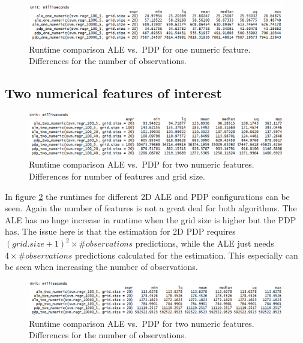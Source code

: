 \documentclass[
]{krantz}
\begin{document}
\begin{figure}
\includegraphics[width=1\linewidth]{images/ale_1_one_numeric_nrows} \caption{Runtime comparison ALE vs.~PDP for one numeric feature. Differences for the number of observations.}\label{fig:runtime1DnumNrow}
\end{figure}



\hypertarget{two-numerical-features-of-interest}{%
\subsection{Two numerical features of interest}\label{two-numerical-features-of-interest}}

\begin{figure}
\includegraphics[width=1\linewidth]{images/ale_1_two_numeric_cols_and_gridsize} \caption{Runtime comparison ALE vs.~PDP for two numeric features. Differences for number of features and grid size.}\label{fig:runtime2DnumColAndSize}
\end{figure}



In figure \ref{fig:runtime2DnumColAndSize} the runtimes for different 2D ALE and PDP configurations can be seen. Again the number of features is not a great deal for both algorithms. The ALE has no huge increase in runtime when the grid size is higher but the PDP has. The issue here is that the estimation for 2D PDP requires \((grid.size + 1)^2 \times \#observations\) predictions, while the ALE just needs \(4 \times \#observations\) predictions calculated for the estimation. This especially can be seen when increasing the number of observations.

\begin{figure}
\includegraphics[width=1\linewidth]{images/ale_1_two_numeric_nrows} \caption{Runtime comparison ALE vs.~PDP for two numeric features. Differences for the number of observations.}\label{fig:runtime2DnumNrow}
\end{figure}
\end{document}
